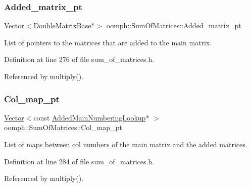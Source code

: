 \subsubsection{\texorpdfstring{Added\+\_\+matrix\+\_\+pt}{Added\_matrix\_pt}}
{\footnotesize\ttfamily \hyperlink{classoomph_1_1Vector}{Vector}$<$\hyperlink{classoomph_1_1DoubleMatrixBase}{Double\+Matrix\+Base}$\ast$$>$ oomph\+::\+Sum\+Of\+Matrices\+::\+Added\+\_\+matrix\+\_\+pt\hspace{0.3cm}{\ttfamily [private]}}



List of pointers to the matrices that are added to the main matrix. 



Definition at line 276 of file sum\+\_\+of\+\_\+matrices.\+h.



Referenced by multiply().

\mbox{\label{classoomph_1_1SumOfMatrices_a0c3227daf48147b18bc5360fafc53d1f}} 
\subsubsection{\texorpdfstring{Col\+\_\+map\+\_\+pt}{Col\_map\_pt}}
{\footnotesize\ttfamily \hyperlink{classoomph_1_1Vector}{Vector}$<$const \hyperlink{classoomph_1_1AddedMainNumberingLookup}{Added\+Main\+Numbering\+Lookup}$\ast$ $>$ oomph\+::\+Sum\+Of\+Matrices\+::\+Col\+\_\+map\+\_\+pt\hspace{0.3cm}{\ttfamily [private]}}



List of maps between col numbers of the main matrix and the added matrices. 



Definition at line 284 of file sum\+\_\+of\+\_\+matrices.\+h.



Referenced by multiply().

\mbox{\label{classoomph_1_1SumOfMatrices_afa2c914fc55c972b1389de3d9b7a7266}} 
